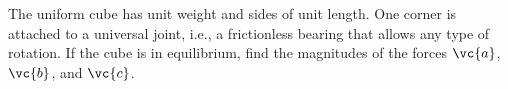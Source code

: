 The uniform cube has unit weight and sides of unit length.
One corner is attached to a universal joint, i.e., a frictionless
bearing that allows any type of rotation.
If the cube is in equilibrium, find the magnitudes of the
forces $\vc{a}$, $\vc{b}$, and $\vc{c}$.\answercheck
